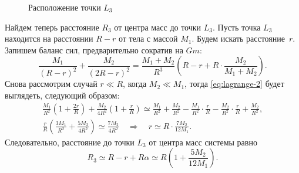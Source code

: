 \begin{wrapfigure}[4]{r}{0.4\tw}
    \centering
    \vspace{-1pc}
    \caption{Расположение точки $L_3$}
    \label{pic:larg-points-3}
\end{wrapfigure}
Найдем теперь расстояние $R_3$ от центра масс до точки $L_3$. Пусть точка $L_3$ находится на расстоянии $R - r$ от тела с массой $M_1$. Будем искать расстояние~$r$. Запишем баланс сил, предварительно сократив на $Gm$:
\begin{equation}
    \frac{M_1}{(R - r)^2} + \frac{M_2}{(2R - r)^2} =  \frac{M_1 + M_2}{R^3} \left(R - r + R \cdot \frac{M_2}{M_1 + M_2} \right).
    \label{eq:lagrange-2}
\end{equation}
Снова рассмотрим случай $r \ll R$, когда $M_2 \ll M_1$, тогда \eqref{eq:lagrange-2} будет выглядеть, следующий образом:
\begin{gather*}
    \frac{M_1}{R^2} \left(1 + \frac{2r}{R} \right) + \frac{M_2}{4R^2} \left(1 + \frac{r}{R} \right) \simeq \frac{M_1}{R^2} + \frac{M_2}{R^2} - \frac{M_1}{R^2} \cdot \frac{r}{R} - \frac{M_2}{R^2} \cdot \frac{r}{R} + \frac{M_2}{R^2},\\
    \frac{r}{R} \left( \frac{3M_1}{R^2} + \frac{5M_2}{4R^2} \right) \simeq \frac{7M_2}{4R^2} \quad \Rightarrow \quad r \simeq R \cdot \frac{7 M_2}{12 M_1}.
\end{gather*}
Следовательно, расстояние до точки $L_3$ от центра масс системы равно
\begin{equation}
    R_3 \simeq R - r + R\alpha \simeq
    R \left( 1 + \frac{ 5 M_2}{12 M_1} \right).
\end{equation}


